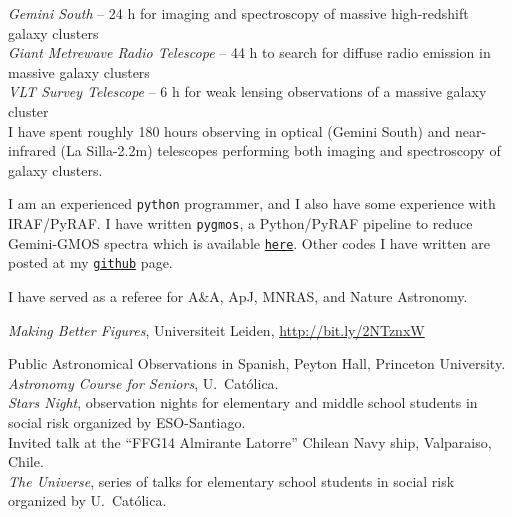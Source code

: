 \documentclass[11pt]{article}
\begin{document}
\noindent
\emph{Gemini South} -- 24 h for imaging and spectroscopy of massive 
high-redshift galaxy clusters\\
\emph{Giant Metrewave Radio Telescope} -- 44 h to search for diffuse radio 
emission in massive galaxy clusters\\
\emph{VLT Survey Telescope} -- 6 h for weak lensing observations of a massive 
galaxy cluster\\


{I have spent roughly 180 hours observing in 
optical (Gemini South) and near-infrared (La Silla-2.2m) telescopes performing both 
imaging and spectroscopy of galaxy clusters.}



I am an experienced \texttt{python} programmer, and I also have some experience 
with IRAF/PyRAF. I have written {\tt pygmos}, a Python/PyRAF pipeline to reduce 
Gemini-GMOS spectra which is available 
\href{https://github.com/cristobal-sifon/pygmos/}{\texttt{here}}. Other codes I 
have written are posted at my 
\href{https://github.com/cristobal-sifon}{\texttt{github}} page.\\


%


\noindent
I have served as a referee for A\&A, ApJ, MNRAS, and Nature Astronomy.


\noindent
{} \emph{Making Better Figures}, Universiteit Leiden, \url{http://bit.ly/2NTznxW}


\noindent
{} Public Astronomical Observations in Spanish, Peyton Hall, Princeton University.\\
 \emph{Astronomy Course for Seniors}, U.\ Cat\'olica.\\
 \emph{Stars Night}, observation nights for elementary and middle school students in social risk organized by ESO-Santiago.\\
 Invited talk at the ``FFG14 Almirante Latorre'' Chilean Navy ship, Valparaiso, Chile.\\
 \emph{The Universe}, series of talks for elementary school students in social risk organized by U.\ Cat\'olica.\\
\end{document}
